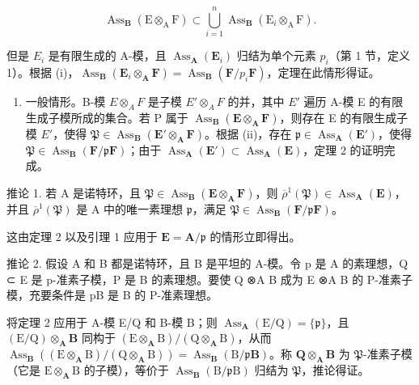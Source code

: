 \[
\operatorname{Ass} _ {\mathbf {B}} (\mathrm{E} \otimes_ {\mathrm{A}} \mathrm{F}) \subset \bigcup_ {i = 1} ^ {n} \operatorname{Ass} _ {\mathbf {B}} (\mathrm{E} _ {i} \otimes_ {\mathrm{A}} \mathrm{F}).
\]

但是 \(E_{i}\) 是有限生成的 A-模，且 \(\operatorname{Ass}_{\mathbf{A}}(\mathbf{E}_{i})\) 归结为单个元素 \(p_{i}\)（第 1 节，定义 1）。根据 (i)，\(\operatorname{Ass}_{\mathbf{B}}(\mathbf{E}_{i} \otimes_{\mathbf{A}} \mathbf{F}) = \operatorname{Ass}_{\mathbf{B}}(\mathbf{F}/p_{i}\mathbf{F})\)，定理在此情形得证。

\begin{enumerate}
\def\labelenumi{(\roman{enumi})}
\setcounter{enumi}{2}
\tightlist
\item
  一般情形。B-模 \(E \otimes_{A} F\) 是子模 \(E' \otimes_{A} F\) 的并，其中 \(E'\) 遍历 A-模 E 的有限生成子模所成的集合。若 P 属于 \(\operatorname{Ass}_{\mathbf{B}}(\mathbf{E} \otimes_{\mathbf{A}} \mathbf{F})\)，则存在 E 的有限生成子模 \(E'\)，使得 \(\mathfrak{P} \in \operatorname{Ass}_{\mathbf{B}}(\mathbf{E}' \otimes_{\mathbf{A}} \mathbf{F})\)。根据 (ii)，存在 \(\mathfrak{p} \in \operatorname{Ass}_{\mathbf{A}}(\mathbf{E}')\)，使得 \(\mathfrak{P} \in \operatorname{Ass}_{\mathbf{B}}(\mathbf{F}/\mathfrak{p}\mathbf{F})\)；由于 \(\operatorname{Ass}_{\mathbf{A}}(\mathbf{E}') \subset \operatorname{Ass}_{\mathbf{A}}(\mathbf{E})\)，定理 2 的证明完成。
\end{enumerate}

推论 1. 若 A 是诺特环，且 \(\mathfrak{P} \in \operatorname{Ass}_{\mathbf{B}}(\mathbf{E} \otimes_{\mathbf{A}} \mathbf{F})\)，则 \(\overline{\rho}^{1}(\mathfrak{P}) \in \operatorname{Ass}_{\mathbf{A}}(\mathbf{E})\)，并且 \(\overline{\rho}^{1}(\mathfrak{P})\) 是 A 中的唯一素理想 \(\mathfrak{p}\)，满足 \(\mathfrak{P} \in \operatorname{Ass}_{\mathbf{B}}(\mathbf{F}/\mathfrak{p}\mathbf{F})\)。

这由定理 2 以及引理 1 应用于 \(\mathbf{E} = \mathbf{A} / \mathfrak{p}\) 的情形立即得出。

推论 2. 假设 A 和 B 都是诺特环，且 B 是平坦的 A-模。令 p 是 A 的素理想，Q ⊂ E 是 p-准素子模，P 是 B 的素理想。要使 Q ⊗A B 成为 E ⊗A B 的 P-准素子模，充要条件是 pB 是 B 的 P-准素理想。

  将定理 2 应用于 A-模 E/Q 和 B-模 B；则 \(\operatorname{Ass}_{\mathbf{A}}(\mathrm{E} / \mathrm{Q}) = \{\mathfrak{p}\}\)，且 \((\mathrm{E} / \mathrm{Q})\otimes_{\mathbf{A}}\mathbf{B}\) 同构于 \((\mathrm{E}\otimes_{\mathbf{A}}\mathrm{B}) / (\mathrm{Q}\otimes_{\mathbf{A}}\mathrm{B})\)，从而 \(\operatorname{Ass}_{\mathbf{B}}((\mathrm{E}\otimes_{\mathbf{A}}\mathrm{B}) / (\mathrm{Q}\otimes_{\mathbf{A}}\mathrm{B})) = \operatorname{Ass}_{\mathbf{B}}(\mathrm{B} / \mathfrak{p}\mathbf{B})\)。称 \(\mathbf{Q}\otimes_{\mathbf{A}}\mathbf{B}\) 为 \(\mathfrak{P}\)-准素子模（它是 \(\mathrm{E}\otimes_{\mathbf{A}}\mathrm{B}\) 的子模），等价于 \(\operatorname{Ass}_{\mathbf{B}}(\mathrm{B} / \mathfrak{p}\mathrm{B})\) 归结为 \(\mathfrak{P}\)，推论得证。

